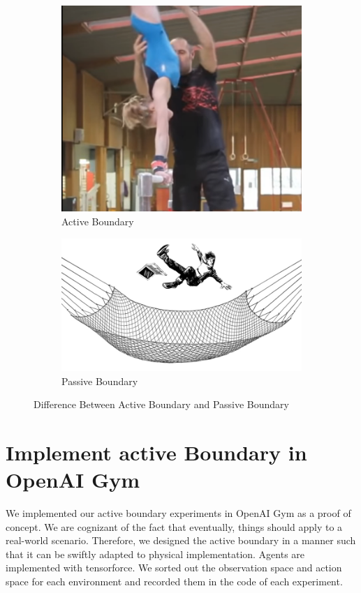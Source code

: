 \documentclass[journal]{IEEEtran}
\begin{document}
\begin{figure}
\centering
\begin{subfigure}{0.25\textwidth}
  \centering
  \includegraphics[width=\linewidth]{training1.png}
  \caption{Active Boundary}
\end{subfigure}%
\begin{subfigure}{.25\textwidth}
  \centering
  \includegraphics[width=\linewidth]{training2.png}
  \caption{Passive Boundary}
\end{subfigure}
\caption{Difference Between Active Boundary and Passive Boundary}
\label{fig:athelete}
\end{figure}

\section{Implement active Boundary in OpenAI Gym}
We implemented our active boundary experiments in OpenAI Gym\cite{Brockman2016OpenAIG} as a proof of concept. We are cognizant of the fact that eventually, things should apply to a real-world scenario. Therefore, we designed the active boundary in a manner such that it can be swiftly adapted to physical implementation. Agents are implemented with tensorforce\cite{tensorforce}. We sorted out the observation space and action space for each environment and recorded them in the code of each experiment.
\end{document}
